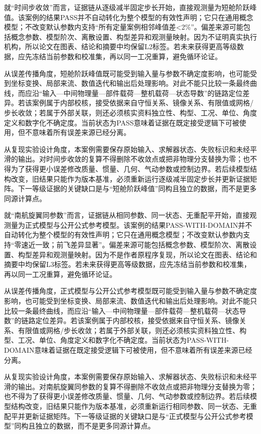 \documentclass[UTF8,12pt,openany]{ctexbook}
\begin{document}
就“时间步收敛”而言，证据链从逐级减半固定步长开始，直接观测量为短舱阶跃峰值。该案例的结果PASS并不自动转化为整个模型的有效性声明；它只在通用概念模型；不改变默认参数内支持“所有定量案例相邻峰值差<2\%”。偏差来源可能包括概念参数、模型阶次、离散设置、构型差异和观测量映射。因为不证明真实执行机构，所以论文在图表、结论和摘要中均保留L2标签。若未来获得更高等级数据，应先冻结当前参数和校准集，再以同一工况重算，避免循环论证。

从误差传播角度，短舱阶跃峰值既可能受到输入量与参数不确定度影响，也可能受到坐标变换、局部来流、数值迭代和输出后处理影响。对此不能只比较一条最终曲线，而应沿“输入—中间物理量—部件载荷—整机载荷—状态导数”的链路定位差异。若该案例属于内部校核，接受依据来自守恒关系、镜像关系、有限值或网格/步长收敛；若属于外部关联，则还必须核实资料独立性、构型、工况、单位、角度定义和数字化不确定度。当前状态为PASS意味着证据在既定接受逻辑下可被使用，但不意味着所有误差来源已经分离。

从复现实验设计角度，本案例需要保存原始输入、求解器状态、失败标识和未经平滑的输出。对时间步收敛的复算不得删除不收敛点或把非物理分支替换为零；也不得为了获得更小误差修改质量、惯量、几何、气动参数或控制边界。若后续模型结构改变，旧结果只能作为版本基准，必须重新运行逐级减半固定步长并更新证据矩阵。下一等级证据的关键缺口是与“短舱阶跃峰值”同构且独立的数据，而不是更多同源计算点。

就“南航旋翼同参数”而言，证据链从相同参数、同一状态、无重配平开始，直接观测量为正式模型与公开公式参考模型。该案例的结果PASS-WITH-DOMAIN并不自动转化为整个模型的有效性声明；它只在通用概念模型；不改变默认参数内支持“零速近一致；前飞差异显著”。偏差来源可能包括概念参数、模型阶次、离散设置、构型差异和观测量映射。因为不是作者原程序复现，所以论文在图表、结论和摘要中均保留L3标签。若未来获得更高等级数据，应先冻结当前参数和校准集，再以同一工况重算，避免循环论证。

从误差传播角度，正式模型与公开公式参考模型既可能受到输入量与参数不确定度影响，也可能受到坐标变换、局部来流、数值迭代和输出后处理影响。对此不能只比较一条最终曲线，而应沿“输入—中间物理量—部件载荷—整机载荷—状态导数”的链路定位差异。若该案例属于内部校核，接受依据来自守恒关系、镜像关系、有限值或网格/步长收敛；若属于外部关联，则还必须核实资料独立性、构型、工况、单位、角度定义和数字化不确定度。当前状态为PASS-WITH-DOMAIN意味着证据在既定接受逻辑下可被使用，但不意味着所有误差来源已经分离。

从复现实验设计角度，本案例需要保存原始输入、求解器状态、失败标识和未经平滑的输出。对南航旋翼同参数的复算不得删除不收敛点或把非物理分支替换为零；也不得为了获得更小误差修改质量、惯量、几何、气动参数或控制边界。若后续模型结构改变，旧结果只能作为版本基准，必须重新运行相同参数、同一状态、无重配平并更新证据矩阵。下一等级证据的关键缺口是与“正式模型与公开公式参考模型”同构且独立的数据，而不是更多同源计算点。
\end{document}
